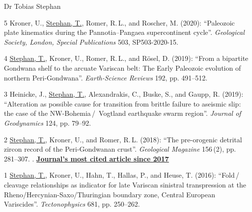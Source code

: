 \documentclass[10pt, paper=letter]{scrartcl} %
\begin{document}
\begin{cv}{\textsf{Dr Tobias Stephan}}
\begin{cvlist}{}
        \item[5] Kroner, U., \ul{Stephan, T.}, Romer, R.\,L., and Roscher, M. (2020): \enquote{Paleozoic plate kinematics during the Pannotia--Pangaea supercontinent cycle}. \textit{Geological Society, London, Special Publications} 503, SP503-2020-15. 
        \item[4] \ul{Stephan, T.}, Kroner, U., Romer, R.\,L., and R\"osel, D. (2019): \enquote{From a bipartite Gondwana shelf to the arcuate Variscan belt: The Early Paleozoic evolution of northern Peri-Gondwana}. \textit{Earth-Science Reviews} 192, pp. 491--512. 
        \item[3] Heinicke, J., \ul{Stephan, T.}, Alexandrakis, C., Buske, S., and Gaupp, R. (2019): \enquote{Alteration as possible cause for transition from brittle failure to aseismic slip: the case of the NW-Bohemia\,/\, Vogtland earthquake swarm region}. \textit{Journal of Geodynamics} 124, pp. 79--92. 
        \item[2] \ul{Stephan, T.}, Kroner, U., and Romer, R.\,L. (2018): \enquote{The pre-orogenic detrital zircon record of the Peri-Gondwanan crust}. \textit{Geological Magazine} 156\,(2), pp. 281--307.\newline
        .
        \href{https://www.cambridge.org/core/journals/geological-magazine/most-cited?searchWithinIds=277295E1DFDC1E4700796E746AE514CC&productType=JOURNAL_ARTICLE&pageSize=20&filters\%5BisCitedByMin\%5D=0&template=cambridge-core\%2Fjournal\%2Farticle-listings\%2Flistings-wrapper&displayNasaAds=false&showCitationNumbers=true&suppressArticleTypeGrouping=true&sort=platformMetadata.citationCount.crossRef\%3Adesc&filters\%5BdateYearRange\%5D\%5Bfrom\%5D=2017}{\textbf{Journal's most cited article since 2017}}
        \item[1] \ul{Stephan, T.}, Kroner, U., Hahn, T., Hallas, P., and Heuse, T. (2016): \enquote{Fold\,/\,cleavage relationships as indicator for late Variscan sinistral transpression at the Rheno\-/Hercynian\--Saxo\-/Thuringian boundary zone, Central European Variscides}. \textit{Tectonophysics} 681, pp. 250--262. 

    \end{cvlist}


\end{cv}
\end{document}
